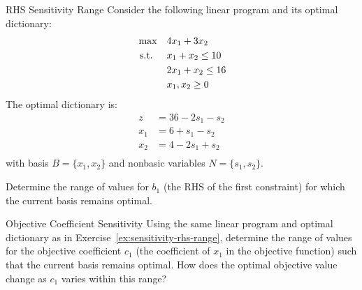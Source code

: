 \begin{ex}{RHS Sensitivity Range}{}
\label{ex:sensitivity-rhs-range}
 Consider the following linear program and its optimal dictionary:
\[
\begin{aligned}
\max \quad & 4x_1 + 3x_2 \\
\mbox{ s.t. } \quad
& x_1 + x_2 \leq 10 \\
& 2x_1 + x_2 \leq 16 \\
& x_1, x_2 \geq 0
\end{aligned}
\]
The optimal dictionary is:
\[
\begin{aligned}
z &= 36 - 2s_1 - s_2 \\
x_1 &= 6 + s_1 - s_2 \\
x_2 &= 4 - 2s_1 + s_2 \\
\end{aligned}
\]
with basis $B = \{x_1, x_2\}$ and nonbasic variables $N = \{s_1, s_2\}$.

Determine the range of values for $b_1$ (the RHS of the first constraint) for which the current basis remains optimal.
\exrefs{\S\ref{sec:sensitivity-rhs}}
\end{ex}


\begin{ex}{Objective Coefficient Sensitivity}{}
 Using the same linear program and optimal dictionary as in Exercise~\ref{ex:sensitivity-rhs-range}, determine the range of values for the objective coefficient $c_1$ (the coefficient of $x_1$ in the objective function) such that the current basis remains optimal. How does the optimal objective value change as $c_1$ varies within this range?
\exrefs{\S\ref{sec:sensitivity-cost}}
\end{ex}

